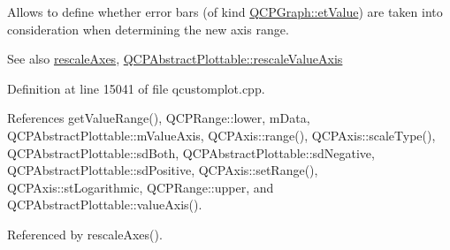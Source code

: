 Allows to define whether error bars (of kind \hyperlink{class_q_c_p_graph_ad23b514404bd2cb3216f57c90904d6afa147022ccdc49f6bd48f904cb4f61872e}{Q\+C\+P\+Graph\+::et\+Value}) are taken into consideration when determining the new axis range.

\begin{DoxySeeAlso}{See also}
\hyperlink{class_q_c_p_graph_aa35b75b9032800d783df749c8a004ee9}{rescale\+Axes}, \hyperlink{class_q_c_p_abstract_plottable_abfd0805eb1d955c0111a990246658324}{Q\+C\+P\+Abstract\+Plottable\+::rescale\+Value\+Axis} 
\end{DoxySeeAlso}


Definition at line 15041 of file qcustomplot.\+cpp.



References get\+Value\+Range(), Q\+C\+P\+Range\+::lower, m\+Data, Q\+C\+P\+Abstract\+Plottable\+::m\+Value\+Axis, Q\+C\+P\+Axis\+::range(), Q\+C\+P\+Axis\+::scale\+Type(), Q\+C\+P\+Abstract\+Plottable\+::sd\+Both, Q\+C\+P\+Abstract\+Plottable\+::sd\+Negative, Q\+C\+P\+Abstract\+Plottable\+::sd\+Positive, Q\+C\+P\+Axis\+::set\+Range(), Q\+C\+P\+Axis\+::st\+Logarithmic, Q\+C\+P\+Range\+::upper, and Q\+C\+P\+Abstract\+Plottable\+::value\+Axis().



Referenced by rescale\+Axes().


